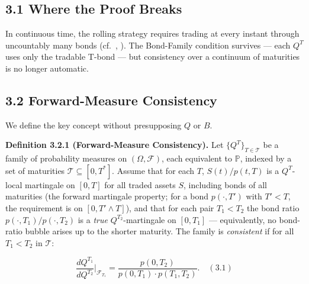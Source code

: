 \documentclass[
]{article}
\begin{document}
\subsection{3.1 Where the Proof Breaks}\label{where-the-proof-breaks}

In continuous time, the rolling strategy requires trading at every
instant through uncountably many bonds (cf.~\citealt{Bjork1997}, \citealt{DoberleinSchweizer2001}). The Bond-Family condition survives --- each \(Q^T\)
uses only the tradable T-bond --- but consistency over a continuum of
maturities is no longer automatic.

\subsection{3.2 Forward-Measure
Consistency}\label{forward-measure-consistency}

We define the key concept without presupposing \(Q\) or \(B\).

\textbf{Definition 3.2.1 (Forward-Measure Consistency).} Let
\(\{Q^T\}_{T \in \mathcal{T}}\) be a family of probability measures on
\((\Omega, \mathcal{F})\), each equivalent to \(\mathbb{P}\), indexed by
a set of maturities \(\mathcal{T} \subseteq [0, T^*]\). Assume that for
each \(T\), \(S(t)/p(t,T)\) is a \(Q^T\)-local martingale on \([0,T]\)
for all traded assets \(S\), including bonds of all maturities (the
forward martingale property; for a bond \(p(\cdot,T')\) with \(T' < T\),
the requirement is on \([0, T' \wedge T]\)), and that for each pair
\(T_1 < T_2\) the bond ratio \(p(\cdot,T_1)/p(\cdot,T_2)\) is a
\emph{true} \(Q^{T_2}\)-martingale on \([0,T_1]\) --- equivalently, no
bond-ratio bubble arises up to the shorter maturity. The family is
\emph{consistent} if for all \(T_1 < T_2\) in \(\mathcal{T}\):

\[\frac{dQ^{T_1}}{dQ^{T_2}}\bigg|_{\mathcal{F}_{T_1}} = \frac{p(0,T_2)}{p(0,T_1) \cdot p(T_1,T_2)}.   \quad (3.1)\]
\end{document}
